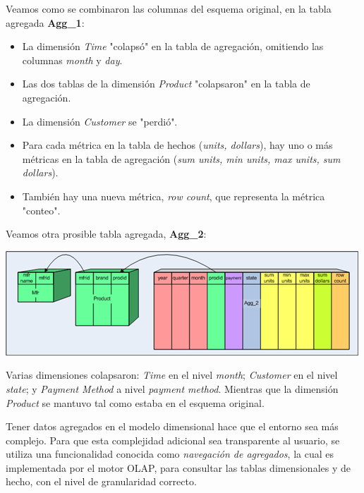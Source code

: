 \documentclass{fancyslides}
\begin{document}
\begin{frame}
\misc
{Veamos como se combinaron las columnas del esquema original, en la tabla agregada \textbf{Agg\_1}:

\begin{itemize}
  \item La dimensión \textit{Time} "colapsó" en la tabla de agregación, omitiendo las columnas \textit{month} y \textit{day}.
  \item Las dos tablas de la dimensión \textit{Product} "colapsaron" en la tabla de agregación.
  \item La dimensión \textit{Customer} se "perdió".
  \item Para cada métrica en la tabla de hechos (\textit{units, dollars}), hay uno o más métricas en la tabla de agregación (\textit{sum units, min units, max units, sum dollars}).
  \item También hay una nueva métrica, \textit{row count}, que representa la métrica "conteo".
\end{itemize}
}
\end{frame}


\begin{frame}
\misc
{

Veamos otra prosible tabla agregada, \textbf{Agg\_2}:

\begin{center}
\includegraphics[scale=0.5]{aggregate_tables_3}
\end{center}

Varias dimensiones colapsaron: \textit{Time} en el nivel \textit{month}; \textit{Customer} en el nivel \textit{state};
y \textit{Payment Method} a nivel \textit{payment method}. Mientras que la dimensión \textit{Product} se mantuvo tal como estaba en el esquema original.}
\end{frame}


\begin{frame}
\misc
{
Tener datos agregados en el modelo dimensional hace que el entorno sea más complejo.
Para que esta complejidad adicional sea transparente al usuario, se utiliza una funcionalidad conocida como \textit{navegación de agregados},
la cual es implementada por el motor OLAP, para consultar las tablas dimensionales y de hecho, con el nivel de granularidad correcto.
}
\end{frame}
\end{document}
